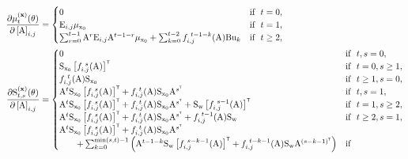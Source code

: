 \begin{align}
        \pdv{\mu^{(\mathbf{x})}_t(\vctheta)}{\left[\mxA \right]_{i,j}} &= \begin{cases}
            0 &\text{if }\  t=0,\\
            \mxE_{i,j} \mu_{\vcx_0} &\text{if }\  t=1,\\
            \sum_{r=0}^{t-1} \mxA^{r}\mxE_{i,j}\mxA^{t-1-r}\mu_{\vcx_0} + \sum_{k=0}^{t-2}f_{i,j}^{\ t-1-k}(\mxA)\mxB\vcu_k&\text{if }\  t\geq2,
        \end{cases}
        \label{eq:J derivative A2}\\
        \pdv{\mxS^{(\mathbf{x})}_{t,s}(\vctheta)}{\left[ \mxA \right]_{i,j}} &= \begin{cases}
            0 &\text{if }\  t,s=0,\\
            \mxS_{\vcx_0}\left[ f^{\ s}_{i,j}(\mxA) \right]^\tr &\text{if }\  t=0,s\geq 1,\\
            f^{\ t}_{i,j}(\mxA)\mxS_{\vcx_0} &\text{if }\  t \geq 1, s=0,\\
            \mxA^{t}\mxS_{\vcx_0} \left[ f^{\ s}_{i,j}(\mxA)\right]^\tr + f^{\ t}_{i,j}(\mxA)\mxS_{\vcx_0}\mxA^{s^\tr}  &\text{if }\ 
             t,s=1,\\
            \mxA^{t}\mxS_{\vcx_0} \left[ f^{\ s}_{i,j}(\mxA)\right]^\tr + f^{\ t}_{i,j}(\mxA)\mxS_{\vcx_0}\mxA^{s^\tr} + \mxS_\vcw \left[ f_{i,j}^{\ s-1}(\mxA) \right]^\tr &\text{if }\ 
             t=1,s\geq 2,\\
            \mxA^{t}\mxS_{\vcx_0} \left[ f^{\ s}_{i,j}(\mxA)\right]^\tr + f^{\ t}_{i,j}(\mxA)\mxS_{\vcx_0}\mxA^{s^\tr} + f_{i,j}^{\ t-1}(\mxA) \mxS_\vcw  &\text{if }\ 
             t \geq 2,s = 1,\\
            \mxA^{t}\mxS_{\vcx_0} \left[ f^{\ s}_{i,j}(\mxA)\right]^\tr + f^{\ t}_{i,j}(\mxA)\mxS_{\vcx_0}\mxA^{s^\tr} &\\
            \qquad+ \sum_{k=0}^{\min (s,t)-1} \left( \mxA^{t-1-k}\mxS_\vcw \left[ f_{i,j}^{\ s-k-1}(\mxA) \right]^\tr + f_{i,j}^{\ t-k-1}(\mxA)  \mxS_\vcw \mxA^{(s-k-1)^\tr}  \right) &\text{if }\ 

\end{cases}
\end{align}
